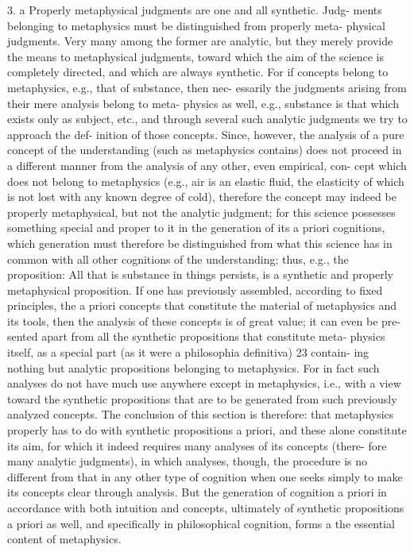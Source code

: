 3. a Properly metaphysical judgments are one and all synthetic. Judg-
ments belonging to metaphysics must be distinguished from properly meta-
physical judgments. Very many among the former are analytic, but they
merely provide the means to metaphysical judgments, toward which the
aim of the science is completely directed, and which are always synthetic.
For if concepts belong to metaphysics, e.g., that of substance, then nec-
essarily the judgments arising from their mere analysis belong to meta-
physics as well, e.g., substance is that which exists only as subject, etc.,
and through several such analytic judgments we try to approach the def-
inition of those concepts. Since, however, the analysis of a pure concept
of the understanding (such as metaphysics contains) does not proceed in
a different manner from the analysis of any other, even empirical, con-
cept which does not belong to metaphysics (e.g., air is an elastic ﬂuid, the
elasticity of which is not lost with any known degree of cold), therefore
the concept may indeed be properly metaphysical, but not the analytic
judgment; for this science possesses something special and proper to it in
the generation of its a priori cognitions, which generation must therefore
be distinguished from what this science has in common with all other
cognitions of the understanding; thus, e.g., the proposition: All that is
substance in things persists, is a synthetic and properly metaphysical
proposition.
If one has previously assembled, according to ﬁxed principles, the a
priori concepts that constitute the material of metaphysics and its tools,
then the analysis of these concepts is of great value; it can even be pre-
sented apart from all the synthetic propositions that constitute meta-
physics itself, as a special part (as it were a philosophia deﬁnitiva) 23 contain-
ing nothing but analytic propositions belonging to metaphysics. For in
fact such analyses do not have much use anywhere except in metaphysics,
i.e., with a view toward the synthetic propositions that are to be generated
from such previously analyzed concepts.
The conclusion of this section is therefore: that metaphysics properly
has to do with synthetic propositions a priori, and these alone constitute
its aim, for which it indeed requires many analyses of its concepts (there-
fore many analytic judgments), in which analyses, though, the procedure
is no different from that in any other type of cognition when one seeks
simply to make its concepts clear through analysis. But the generation
of cognition a priori in accordance with both intuition and concepts,
ultimately of synthetic propositions a priori as well, and speciﬁcally in
philosophical cognition, forms a the essential content of metaphysics.


